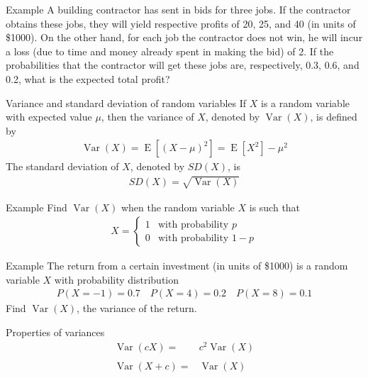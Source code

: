 \documentclass{beamer}
\newcommand{\E}{\operatorname{E}}
\newcommand{\Var}{\operatorname{Var}}
\begin{document}
\begin{frame}[t]{Example}
  A building contractor has sent in bids for three jobs. If the contractor
  obtains these jobs, they will yield respective profits of 20, 25, and 40 (in
  units of \$1000).  On the other hand, for each job the contractor does not
  win, he will incur a loss (due to time and money already spent in making the
  bid) of 2. If the probabilities that the contractor will get these jobs are,
  respectively, 0.3, 0.6, and 0.2, what is the expected total profit?
\end{frame}

\begin{frame}{Variance and standard deviation of random variables}
  If $X$ is a random variable with expected value $\mu$, then the variance of
  $X$, denoted by $\Var(X)$, is defined by
  \begin{align*}
    \Var(X) = \E[{(X - \mu)}^2] = \E[X^2] - \mu^2
  \end{align*}
  The standard deviation of $X$, denoted by $SD(X)$, is
  \begin{align*}
    SD(X) = \sqrt{\Var(X)}
  \end{align*}
\end{frame}

\begin{frame}[t]{Example}
  Find $\Var(X)$ when the random variable $X$ is such that
  \begin{align*}
    X=
    \begin{cases}
      1 & \text{with probability }p\\
      0 & \text{with probability }1-p
    \end{cases}
  \end{align*}
\end{frame}

\begin{frame}[t]{Example}
  The return from a certain investment (in units of \$1000) is a random variable
  $X$ with probability distribution
  \begin{align*}
    P(X=-1) = 0.7 \quad
    P(X=4) = 0.2 \quad
    P(X=8) = 0.1
  \end{align*}
  Find $\Var(X)$, the variance of the return.
\end{frame}

\begin{frame}{Properties of variances}
  \begin{align*}
    \Var(cX) =& c^2\Var(X)\\
    \\
    \Var(X+c) =& \Var(X)
  \end{align*}
\end{frame}
\end{document}
